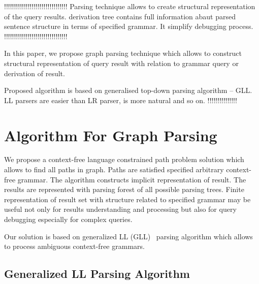 \documentclass{sig-alternate} %
\begin{document}
!!!!!!!!!!!!!!!!!!!!!!!!!!!!!!!!
Parsing technique allows to create structural representation of the query results. derivation tree contains full information abaut parsed sentence structure in terms of specified grammar. It simplify debugging process. 
!!!!!!!!!!!!!!!!!!!!!!!!!!!!!!!!

In this paper, we propose graph parsing technique which allows to construct structural representation of query result with relation to grammar query or derivation of result.

Proposed algorithm is based on generalised top-down parsing algorithm -- GLL. LL parsers are easier than LR parser, is more natural and so on. !!!!!!!!!!!!!!!





\section{Algorithm For Graph Parsing}
We propose a context-free language constrained path problem solution which allows to find all paths in graph. Paths are satisfied specified arbitrary context-free grammar. The algorithm constructs implicit representation of result. The results are represented with parsing forest of all possible parsing trees. 
Finite representation of result set with structure related to specified grammar may be useful not only for results understanding and processing but also for query debugging especially for complex queries. 

Our solution is based on generalized LL (GLL)~\cite{scott2010gll, FastPracticalGLL} parsing algorithm which allows to process ambiguous context-free grammars.


\subsection{Generalized LL Parsing Algorithm}
\end{document}
